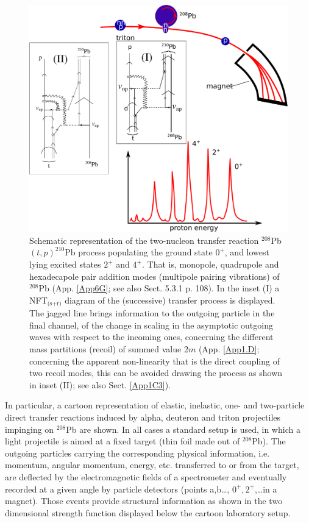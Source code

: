 \begin{figure}
\centerline {
\includegraphics*[width=15cm]{introduccion/figs/figintro3}
}
\caption{Schematic representation of the two-nucleon transfer reaction $^{208}$Pb$(t,p)^{210}$Pb process populating the ground state $0^+$, and lowest lying excited states $2^+$ and $4^+$.  That is, monopole, quadrupole and hexadecapole pair addition modes (multipole pairing vibrations) of $^{208}$Pb   (App. \ref{App6G}; see also \cite{Brink:05} Sect. 5.3.1 p. 108). In the inset (I) a NFT$_{\text{(s+r)}}$ diagram of the (successive) transfer process is displayed. The jagged line brings information to the outgoing particle in the final channel, of the change in scaling in the asymptotic outgoing waves with respect to the incoming ones, concerning the different mass partitions (recoil) of summed value 2$m$ (App. \ref{App1.D}; concerning the apparent non-linearity that is the direct coupling of two recoil modes, this can be avoided drawing the process as shown in inset (II); see also Sect. \ref{App1C3}).}
\label{figintro3}
\end{figure}
In particular, a cartoon representation of elastic, inelastic, one- and two-particle direct transfer reactions induced by alpha, deuteron and triton  projectiles impinging on $^{208}$Pb are shown. In all cases a standard setup is used, in which a light projectile is aimed at a fixed target (thin foil made out of $^{208}$Pb). The outgoing particles carrying the corresponding physical information, i.e. momentum, angular momentum, energy, etc. transferred to or from the target, are deflected by the electromagnetic fields of a spectrometer and eventually recorded at a given angle by particle detectors (points a,b\dots, $0^+,2^+$,\dots in a magnet). Those events provide structural information as shown in the two dimensional strength function displayed below the cartoon laboratory setup. 

